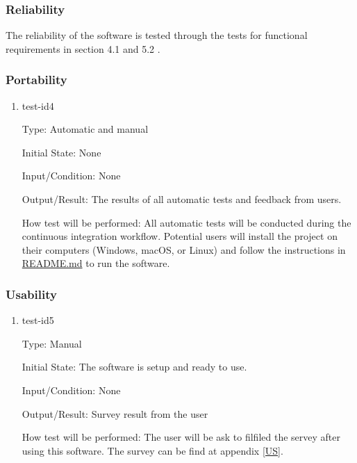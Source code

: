 \documentclass[12pt, titlepage]{article}
\begin{document}
\subsubsection{Reliability}

The reliability of the software is tested through the tests for
functional requirements in section 4.1 and 5.2 .

\subsubsection{Portability}

\begin{enumerate}

\item{test-id4\\}

Type: Automatic and manual
					
Initial State: None
					
Input/Condition: None
					
Output/Result: The results of all automatic tests and feedback from users.

How test will be performed: All automatic tests will be conducted during the continuous integration workflow. Potential users will install the project on their computers (Windows, macOS, or Linux) and follow the instructions in \href{https://github.com/V-AS/Two-tower-recommender-system/blob/main/README.md}{README.md} to run the software. 
\end{enumerate}


\subsubsection{Usability}

\begin{enumerate}

\item{test-id5\\}

Type: Manual

Initial State: The software is setup and ready to use.

Input/Condition: None

Output/Result: Survey result from the user

How test will be performed: The user will be ask to filfiled the servey after using this software. The survey can be find at appendix \ref{US}.


\end{enumerate}
\end{document}
